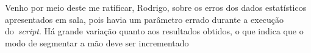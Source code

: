 \documentclass[conference]{Trabalho_Final}
\begin{document}
Venho por meio deste me ratificar, Rodrigo, sobre os erros dos dados estat\'isticos apresentados em sala, pois havia um par\^ametro errado durante a execu\c{c}\~ao do~\textit{script}. H\'a grande varia\c{c}\~ao quanto aos resultados obtidos, o que indica que o modo de segmentar a m\~ao deve ser incrementado





%
%
%
\end{document}
